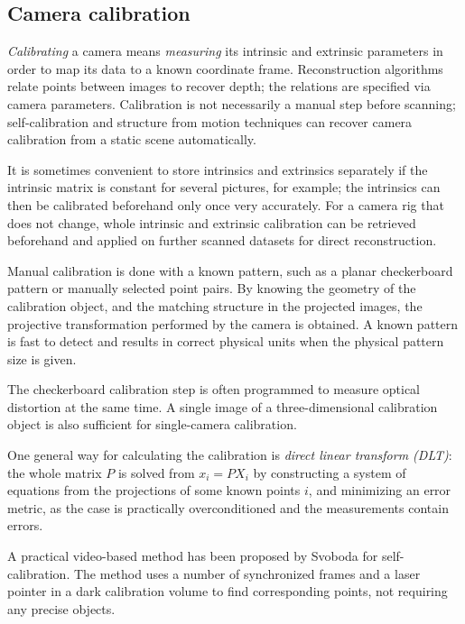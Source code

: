 
\subsection{Camera calibration} %

\emph{Calibrating} a camera means \emph{measuring} its intrinsic and extrinsic parameters in order to map its data to a known coordinate frame.
Reconstruction algorithms relate points between images to recover depth; the relations are specified via camera parameters.
Calibration is not necessarily a manual step before scanning;
self-calibration and structure from motion techniques can recover camera calibration from a static scene automatically. \cite{pollefeys1999hand,hartley03multiview}

It is sometimes convenient to store intrinsics and extrinsics separately if the intrinsic matrix is constant for several pictures, for example;
the intrinsics can then be calibrated beforehand only once very accurately.
For a camera rig that does not change, whole intrinsic and extrinsic calibration can be retrieved beforehand and applied on further scanned datasets for direct reconstruction.

Manual calibration is done with a known pattern, such as a planar checkerboard pattern \cite{chuang2002performance,zhang2000flexible} or manually selected point pairs.
By knowing the geometry of the calibration object, and the matching structure in the projected images, the projective transformation performed by the camera is obtained.
A known pattern is fast to detect and results in correct physical units when the physical pattern size is given.

The checkerboard calibration step is often programmed to measure optical distortion at the same time. \cite{opencv,camcalmatlab}
A single image of a three-dimensional calibration object is also sufficient for single-camera calibration. \cite[p. 181]{hartley03multiview}

One general way for calculating the calibration is \emph{direct linear transform (DLT)}:
the whole matrix $P$ is solved from $x_i = PX_i$ by constructing a system of equations from the projections of some known points $i$, and minimizing an error metric, as the case is practically overconditioned and the measurements contain errors. \cite{hartley03multiview}

A practical video-based method has been proposed by Svoboda for self-calibration.
The method uses a number of synchronized frames and a laser pointer in a dark calibration volume to find corresponding points, not requiring any precise objects. \cite{svoboda2005convenient}

